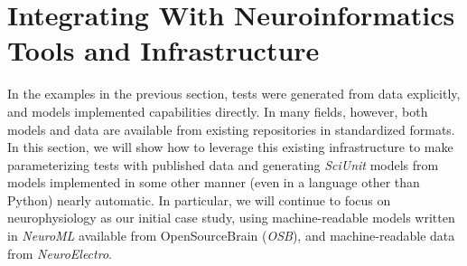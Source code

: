 \documentclass{frontiersSCNS}
\begin{document}
\section{Integrating With Neuroinformatics Tools and Infrastructure}\label{sec:neuronunit}
In the examples in the previous section, tests were generated from data explicitly, and models implemented capabilities directly. 
In many fields, however, both models and data are available from existing  repositories in standardized formats. 
In this section, we will show how to leverage this existing infrastructure to make parameterizing tests with published data and generating \textit{SciUnit} models from models implemented in some other manner (even in a language other than Python) nearly automatic. 
In particular, we will continue to focus on neurophysiology as our initial case study, using machine-readable models written in \textit{NeuroML} available from OpenSourceBrain (\textit{OSB}), and machine-readable data from \textit{NeuroElectro}. 
\end{document}
